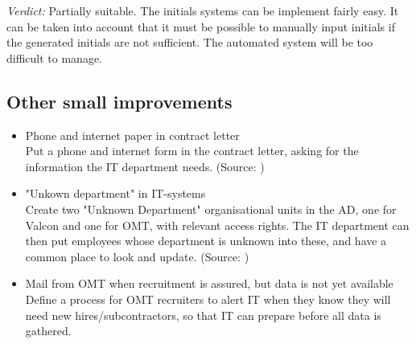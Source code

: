 \emph{Verdict:}
Partially suitable. The initials systems can be implement fairly easy. It can be taken into account that it must be possible to manually input initials if the generated initials are not sufficient.
The automated system will be too difficult to manage.

\subsection{Other small improvements}
\begin{itemize}
	\item Phone and internet paper in contract letter\\
	
			Put a phone and internet form in the contract letter, asking for the information the IT department needs.
			(Source: )			
	
	\item "Unkown department" in IT-systems\\
	
			Create two "Unknown Department" organisational units in the AD, one for Valcon and one for OMT, with relevant access rights. The IT department can then put employees whose department is unknown into these, and have a common place to look and update.
			(Source: )
			
	\item Mail from OMT when recruitment is assured, but data is not yet available\\
	
			Define a process for OMT recruiters to alert IT when they know they will need new hires/subcontractors, so that IT can prepare before all data is gathered.
\end{itemize}
